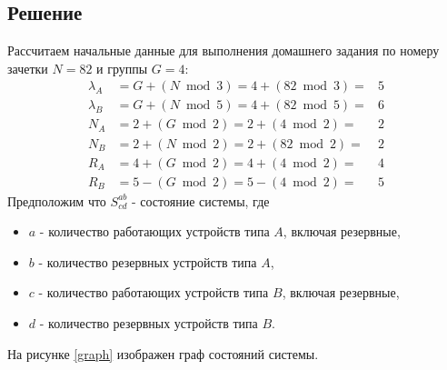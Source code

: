 \subsection{Решение}

Рассчитаем начальные данные для выполнения домашнего задания по номеру зачетки $N = 82$ и группы $G = 4$:
\[
\begin{matrix}
    \lambda_A & = G + (N \bmod 3) = 4 + (82 \bmod 3) = & 5 \\
    \lambda_B & = G + (N \bmod 5) = 4 + (82 \bmod 5) = & 6 \\
    N_A & = 2 + (G \bmod 2) = 2 + (4 \bmod 2) = & 2 \\
    N_B & = 2 + (N \bmod 2) = 2 + (82 \bmod 2) = & 2 \\
    R_A & = 4 + (G \bmod 2) = 4 + (4 \bmod 2) = & 4 \\
    R_B & = 5 - (G \bmod 2) = 5 - (4 \bmod 2) = & 5
\end{matrix}
\]
Предположим что $S^{ab}_{cd}$ - состояние системы, где
\begin{itemize}
    \item $a$ - количество работающих устройств типа $A$, включая резервные,
    \item $b$ - количество резервных устройств типа $A$,
    \item $c$ - количество работающих устройств типа $B$, включая резервные,
    \item $d$ - количество резервных устройств типа $B$.
\end{itemize}
На рисунке \ref{graph} изображен граф состояний системы.


